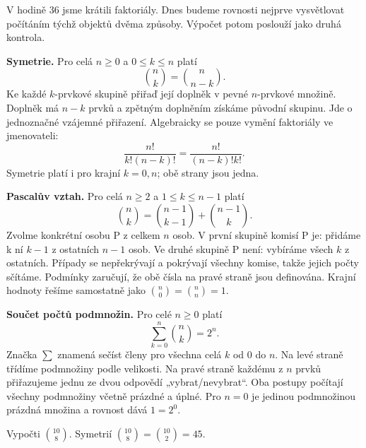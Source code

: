 \documentclass[11pt,a4paper]{article}
\begin{document}
V hodině 36 jsme krátili faktoriály. Dnes budeme rovnosti nejprve vysvětlovat počítáním týchž objektů dvěma způsoby. Výpočet potom poslouží jako druhá kontrola.


\textbf{Symetrie.} Pro celá $n\geq0$ a $0\leq k\leq n$ platí
\[
 \binom nk=\binom n{n-k}.
\]
Ke každé $k$-prvkové skupině přiřaď její doplněk v pevné $n$-prvkové množině. Doplněk má $n-k$ prvků a zpětným doplněním získáme původní skupinu. Jde o jednoznačné vzájemné přiřazení. Algebraicky se pouze vymění faktoriály ve jmenovateli:
\[
 \frac{n!}{k!(n-k)!}=\frac{n!}{(n-k)!k!}.
\]
Symetrie platí i pro krajní $k=0,n$; obě strany jsou jedna.

\textbf{Pascalův vztah.} Pro celá $n\geq2$ a $1\leq k\leq n-1$ platí
\[
 \binom nk=\binom{n-1}{k-1}+\binom{n-1}k.
\]
Zvolme konkrétní osobu P z celkem $n$ osob. V první skupině komisí P je: přidáme k ní $k-1$ z ostatních $n-1$ osob. Ve druhé skupině P není: vybíráme všech $k$ z ostatních. Případy se nepřekrývají a pokrývají všechny komise, takže jejich počty sčítáme. Podmínky zaručují, že obě čísla na pravé straně jsou definována. Krajní hodnoty řešíme samostatně jako $\binom n0=\binom nn=1$.

\textbf{Součet počtů podmnožin.} Pro celé $n\geq0$ platí
\[
 \sum_{k=0}^{n}\binom nk=2^n.
\]
Značka $\sum$ znamená sečíst členy pro všechna celá $k$ od $0$ do $n$. Na levé straně třídíme podmnožiny podle velikosti. Na pravé straně každému z $n$ prvků přiřazujeme jednu ze dvou odpovědí „vybrat/nevybrat“. Oba postupy počítají všechny podmnožiny včetně prázdné a úplné. Pro $n=0$ je jedinou podmnožinou prázdná množina a rovnost dává $1=2^0$.




\begin{prikladReseniBox}[title={Příklad P1}]
Vypočti \(\binom{10}{8}\).
\tcblower
Symetrií \(\binom{10}{8}=\binom{10}{2}=45\).
\end{prikladReseniBox}
\end{document}
